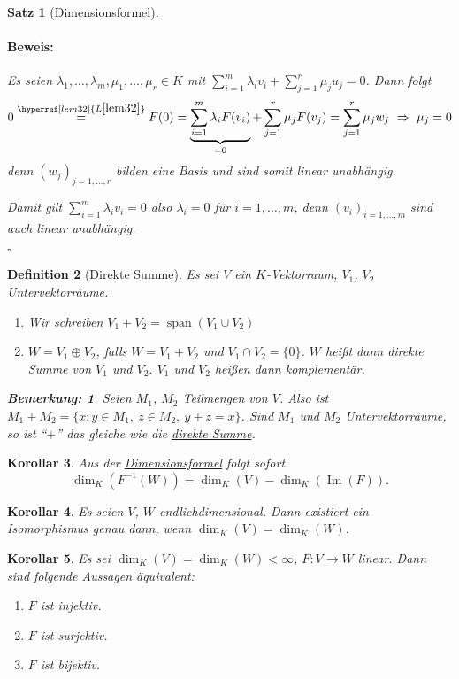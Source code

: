 \documentclass{report}
\newcommand{\lb}{\lambda}
\DeclareMathOperator{\Span}{span}
\DeclareMathOperator{\Ima}{Im}
\theoremstyle{customrem}
\newtheorem*{bem}{Bemerkung\textnormal:}
\theoremstyle{customdef}
\newtheorem{definition}{Definition}[chapter]
\newtheorem{korrolar}[definition]{Korollar}
\newtheorem{satz}[definition]{Satz}
\renewenvironment{proof}{\vspace{-.75cm}\paragraph{Beweis: }}{\vspace{-.5cm}\hfill$\square$}
\begin{document}
\begin{satz}[Dimensionsformel]
\begin{proof}
\begin{enumerate}
				Es seien $\lb_1,\ldots, \lb_m, \mu_1, \ldots, \mu_r\in K$ mit $\sum_{i=1}^{m}\lb_i v_i + \sum_{j=1}^{r}\mu_j u_j=0$. Dann folgt $$0\stackrel{\hyperref[lem32]{L\ref{lem32}}}{=} F(0) = \underbrace{\sum_{i=1}^{m}\lb_i F(v_i)}_{=0} + \sum_{j=1}^{r}\mu_jF(v_j) = \sum_{j=1}^{r}\mu_jw_j\ \Rightarrow \ \mu_j = 0$$ denn $(w_j)_{j=1,\ldots, r}$ bilden eine Basis und sind somit linear unabhängig.
				
				Damit gilt $\sum_{i=1}^{m}\lb_iv_i=0$ also $\lb_i=0$ für $i=1, \ldots, m$, denn $(v_i)_{i=1, \ldots, m}$ sind auch linear unabhängig.\\
			\end{enumerate}
		\end{proof}
	\end{satz}
	
	\begin{definition}[Direkte Summe]
		\label{def38}
		Es sei $V$ ein $K$-Vektorraum, $V_1$, $V_2$ Untervektorräume.
		\begin{enumerate}
			\item Wir schreiben $V_1+V_2=\Span(V_1\cup V_2)$
			\item $W=V_1\oplus V_2$, falls $W=V_1+V_2$ und $V_1\cap V_2 = \{0\}$. $W$ heißt dann direkte Summe von $V_1$ und $V_2$. $V_1$ und $V_2$ heißen dann komplementär.
		\end{enumerate}
		\begin{bem}
			Seien $M_1$, $M_2$ Teilmengen von $V$. Also ist $M_1 + M_2 = \{x:y\in M_1,\ z\in M_2,\ y+z=x\}$. Sind $M_1$ und $M_2$ Untervektorräume, so ist "`$+$"' das gleiche wie die \hyperref[def38]{direkte Summe}.
		\end{bem}
	\end{definition}
	
	\begin{korrolar}		
		Aus der \hyperref[satz37]{Dimensionsformel} folgt sofort $$\dim_K\left(F^{-1}(W)\right) = \dim_K(V)-\dim_K(\Ima(F)).$$
	\end{korrolar}
	
	\begin{korrolar}
		Es seien $V$, $W$ endlichdimensional. Dann existiert ein Isomorphismus genau dann, wenn $\dim_K(V)=\dim_K(W)$.
	\end{korrolar}
	
	\begin{korrolar}
		Es sei $\dim_K(V)=\dim_K(W) < \infty$, $F:V\to W$ linear. Dann sind folgende Aussagen äquivalent:
		
		\begin{enumerate}[leftmargin = 7cm]
			\item[i)] $F$ ist injektiv.
			\item[ii)] $F$ ist surjektiv.
			\item[iii)] $F$ ist bijektiv.
		\end{enumerate}
	\end{korrolar}
	
\end{document}
